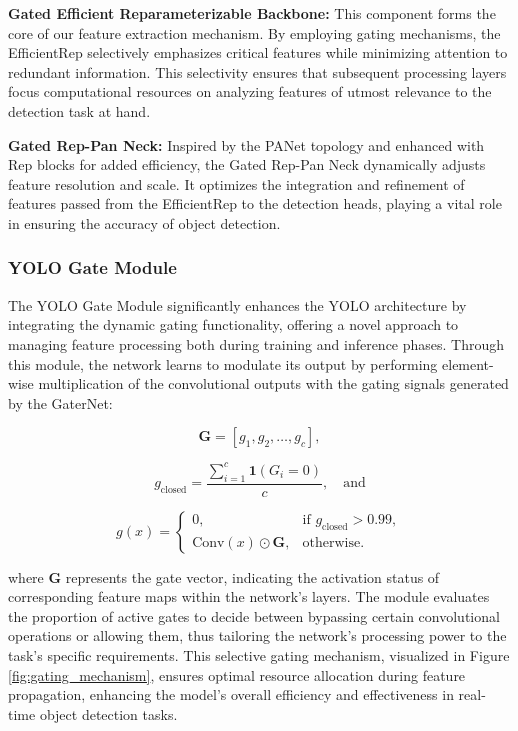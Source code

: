 \textbf{Gated Efficient Reparameterizable Backbone:} This component forms the core of our feature extraction mechanism. By employing gating mechanisms, the EfficientRep selectively emphasizes critical features while minimizing attention to redundant information. This selectivity ensures that subsequent processing layers focus computational resources on analyzing features of utmost relevance to the detection task at hand.

\textbf{Gated Rep-Pan Neck:} Inspired by the PANet topology and enhanced with Rep blocks for added efficiency, the Gated Rep-Pan Neck dynamically adjusts feature resolution and scale. It optimizes the integration and refinement of features passed from the EfficientRep to the detection heads, playing a vital role in ensuring the accuracy of object detection.

\subsubsection{YOLO Gate Module}
The YOLO Gate Module significantly enhances the YOLO architecture by integrating the dynamic gating functionality, offering a novel approach to managing feature processing both during training and inference phases. Through this module, the network learns to modulate its output by performing element-wise multiplication of the convolutional outputs with the gating signals generated by the GaterNet:

\begin{equation}
\mathbf{G} = [g_1, g_2, \ldots, g_c], \label{eq:G_vector}
\end{equation}

\begin{equation}
g_{\text{closed}} = \frac{\sum_{i=1}^{c} \mathbf{1}(G_i = 0)}{c}, \quad \text{and} \label{eq:g_closed}
\end{equation}

\begin{equation}
g(x) = 
\begin{cases} 
0, & \text{if } g_{\text{closed}} > 0.99, \\
\text{Conv}(x) \odot \mathbf{G}, & \text{otherwise}.
\end{cases} \label{eq:conditional_gating}
\end{equation}

\noindent{}where \(\mathbf{G}\) represents the gate vector, indicating the activation status of corresponding feature maps within the network's layers. The module evaluates the proportion of active gates to decide between bypassing certain convolutional operations or allowing them, thus tailoring the network's processing power to the task's specific requirements. This selective gating mechanism, visualized in Figure \ref{fig:gating_mechanism}, ensures optimal resource allocation during feature propagation, enhancing the model's overall efficiency and effectiveness in real-time object detection tasks.

